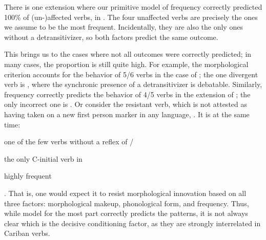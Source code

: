 There is one extension where our primitive model of frequency correctly predicted 100\% of (un-){}affected verbs, in \PWai.
The four unaffected  verbs are precisely the ones we assume to be the most frequent.
Incidentally, they are also the only ones without a detransitivizer, so both factors predict the same outcome.

This brings us to the cases where not all outcomes were correctly predicted; in many cases, the proportion is still quite high.
For example, the morphological criterion accounts for the behavior of 5/6 verbs in the case of \PTir; the one divergent verb is  , where the synchronic presence of a detransitivizer is debatable.
Similarly, frequency correctly predicts the behavior of 4/5 verbs in the extension of \carijo {}; the only incorrect one is  .
Or consider the  resistant verb, which is not attested as having taken on a new first person marker in any language,  .
It is at the same time: \begin{inlinelist}
	\item one of the few  verbs without a reflex of /
	\item the only C-initial  verb in \PC
	\item highly frequent
\end{inlinelist}.
That is, one would expect it to resist morphological innovation based on all three factors: morphological makeup, phonological form, and frequency.
Thus, while  model for the most part correctly predicts the patterns, it is not always clear which is the decisive conditioning factor, as they are strongly interrelated in Cariban  verbs.



%


